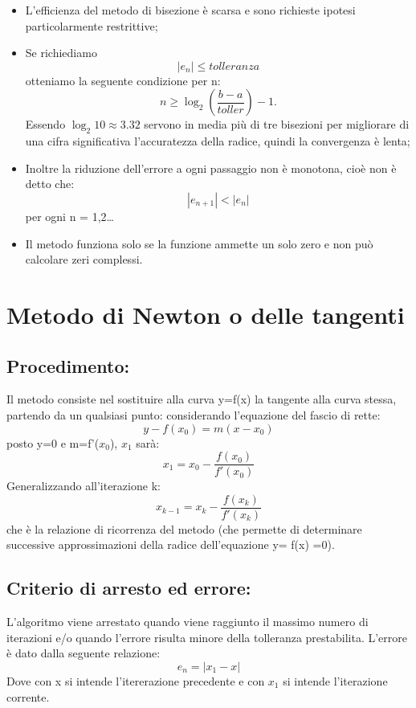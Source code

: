 \documentclass[a4paper,12pt,]{article}
\begin{document}
\begin {itemize}
\item L'efficienza del metodo di bisezione è scarsa e sono richieste ipotesi particolarmente restrittive;
\item Se richiediamo \begin {equation}|e_n| \le tolleranza  \end {equation}otteniamo la seguente condizione per n:
\begin{equation}	n \ge \log_2 (\frac{b-a} {toller}) - 1. \end{equation}
Essendo $ \log_2 10 \approx 3.32$
servono in media più di tre bisezioni per migliorare di una cifra significativa l'accuratezza della radice, quindi la convergenza è  lenta;
\item Inoltre la riduzione dell'errore a ogni passaggio non è monotona, cioè non è detto che:  \begin {equation}|e_{n+1}| < |e_n | \end{equation}per ogni n = 1,2\dots
\item Il metodo funziona solo se la funzione ammette un solo zero e non può calcolare zeri complessi.
\end{itemize}
\section {Metodo di Newton o delle tangenti}		
\subsection{Procedimento:}
Il metodo consiste nel sostituire alla curva  y=f(x)  la tangente alla curva stessa, partendo da un qualsiasi punto: considerando l’equazione del fascio di rette:
\begin{equation} y -   f(x_0)=m(x - x_0) \end{equation} posto y=0 e m=f'($x_0$), $x_1$ sarà:\begin{equation} x_1=x_0-\frac {f(x_0)}{f'(x_0)} \end{equation}
Generalizzando all’iterazione k:  \begin {equation} x_{k-1} =x_k-\frac {f(x_k)}{f'(x_k)} \end {equation} che è la relazione di ricorrenza del metodo (che permette di determinare successive approssimazioni della radice dell'equazione y= f(x) =0).
\subsection{Criterio di arresto ed errore:}
L'algoritmo viene arrestato quando viene raggiunto il massimo numero di iterazioni e/o quando l'errore risulta minore della tolleranza prestabilita.
L'errore è dato dalla seguente relazione:
\begin{equation} e_n=|x_1-x| \end{equation}
Dove con x si intende l'itererazione precedente e con $x_1$ si intende l'iterazione corrente.
\end{document}
